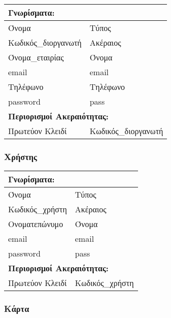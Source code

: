 \begin{tabular}{|p{6cm}|p{8cm}|}
  \multicolumn{2}{l}{\textbf{Γνωρίσματα:}}               \\ \hline
  Όνομα               & Τύπος                            \\ \hline
  Κωδικός\_διοργανωτή & Ακέραιος                         \\ \hline
  Όνομα\_εταιρίας     & Όνομα                            \\ \hline
  email               & email                            \\ \hline
  Τηλέφωνο            & Τηλέφωνο                         \\ \hline
  password            & pass                             \\ \hline
  \multicolumn{2}{l}{\textbf{Περιορισμοί Ακεραιότητας:}} \\ \hline
  Πρωτεύον Κλειδί     & Κωδικός\_διοργανωτή              \\ \hline
\end{tabular}


\subsubsection*{Χρήστης}

\begin{tabular}{|p{6cm}|p{8cm}|}
  \multicolumn{2}{l}{\textbf{Γνωρίσματα:}}               \\ \hline
  Όνομα           & Τύπος                                \\ \hline
  Κωδικός\_χρήστη & Ακέραιος                             \\ \hline
  Ονοματεπώνυμο   & Όνομα                                \\ \hline
  email           & email                                \\ \hline
  password        & pass                                 \\ \hline
  \multicolumn{2}{l}{\textbf{Περιορισμοί Ακεραιότητας:}} \\ \hline
  Πρωτεύον Κλειδί & Κωδικός\_χρήστη                      \\ \hline
\end{tabular}


\subsubsection*{Κάρτα}

